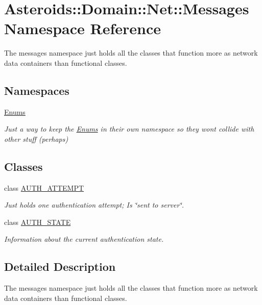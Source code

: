 \hypertarget{namespaceAsteroids_1_1Domain_1_1Net_1_1Messages}{}\section{Asteroids\+:\+:Domain\+:\+:Net\+:\+:Messages Namespace Reference}
\label{namespaceAsteroids_1_1Domain_1_1Net_1_1Messages}


The messages namespace just holds all the classes that function more as network data containers than functional classes.  


\subsection*{Namespaces}
\begin{DoxyCompactItemize}
\item 
 \hyperlink{namespaceAsteroids_1_1Domain_1_1Net_1_1Messages_1_1Enums}{Enums}
\begin{DoxyCompactList}\small\item\em Just a way to keep the \hyperlink{namespaceAsteroids_1_1Domain_1_1Net_1_1Messages_1_1Enums}{Enums} in their own namespace so they won\textquotesingle{}t collide with other stuff (perhaps) \end{DoxyCompactList}\end{DoxyCompactItemize}
\subsection*{Classes}
\begin{DoxyCompactItemize}
\item 
class \hyperlink{classAsteroids_1_1Domain_1_1Net_1_1Messages_1_1AUTH__ATTEMPT}{A\+U\+T\+H\+\_\+\+A\+T\+T\+E\+M\+PT}
\begin{DoxyCompactList}\small\item\em Just holds one authentication attempt; Is \char`\"{}sent to server\char`\"{}. \end{DoxyCompactList}\item 
class \hyperlink{classAsteroids_1_1Domain_1_1Net_1_1Messages_1_1AUTH__STATE}{A\+U\+T\+H\+\_\+\+S\+T\+A\+TE}
\begin{DoxyCompactList}\small\item\em Information about the current authentication state. \end{DoxyCompactList}\end{DoxyCompactItemize}


\subsection{Detailed Description}
The messages namespace just holds all the classes that function more as network data containers than functional classes. 